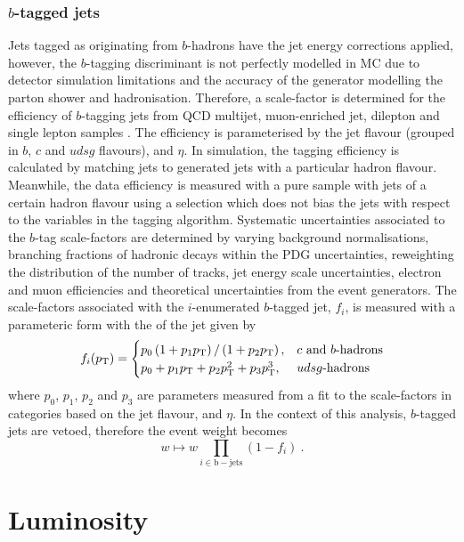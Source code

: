 \subsubsection{$b$-tagged jets}

Jets tagged as originating from $b$-hadrons have the jet energy corrections applied, however, the $b$-tagging discriminant is not perfectly modelled in MC due to detector simulation limitations and the accuracy of the generator modelling the parton shower and hadronisation. Therefore, a scale-factor is determined for the efficiency of $b$-tagging jets from QCD multijet, muon-enriched jet, dilepton \Itt and single lepton \Itt samples \cite{Sirunyan:2017ezt}. The efficiency is parameterised by the jet flavour (grouped in $b$, $c$ and $udsg$ flavours), \pt and $\eta$. In simulation, the tagging efficiency is calculated by matching jets to generated jets with a particular hadron flavour. Meanwhile, the data efficiency is measured with a pure sample with jets of a certain hadron flavour using a selection which does not bias the jets with respect to the variables in the tagging algorithm. Systematic uncertainties associated to the $b$-tag scale-factors are determined by varying background normalisations, branching fractions of hadronic decays within the PDG uncertainties, reweighting the distribution of the number of tracks, jet energy scale uncertainties, electron and muon efficiencies and theoretical uncertainties from the event generators. The scale-factors associated with the $i$-enumerated $b$-tagged jet, $f_i$, is measured with a parameteric form with the \pt of the jet given by
%
\begin{equation}
    f_i(p_{\text{T}}) =
    \begin{cases}
        p_0 \left(1 + p_1 p_{\text{T}}\right)/\left(1 + p_2 p_{\text{T}}\right), & \text{$c$ and $b$-hadrons}\\
        p_0 + p_1 p_{\text{T}} + p_2 p_{\text{T}}^2 + p_3 p_{\text{T}}^3, & \text{$udsg$-hadrons}
    \end{cases}
\end{equation}
%
where $p_0$, $p_1$, $p_2$ and $p_3$ are parameters measured from a fit to the scale-factors in categories based on the jet flavour, \pt and $\eta$. In the context of this analysis, $b$-tagged jets are vetoed, therefore the event weight becomes
%
\begin{equation}
    w \mapsto w \prod_{i\in\mathrm{b-jets}} (1 - f_i)\ .
\end{equation}


\section{Luminosity}

